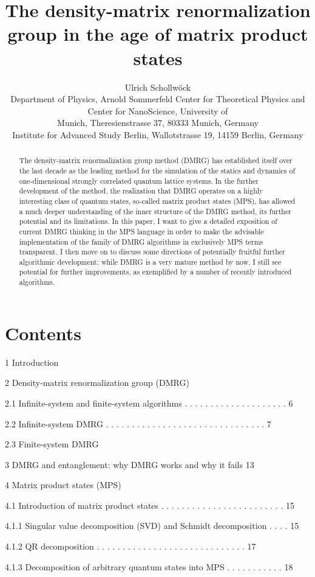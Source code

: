 \documentclass[12pt]{article}
\title{The density-matrix renormalization group in the age of matrix product states }
\author{Ulrich Schollwöck\\
Department of Physics, Arnold Sommerfeld Center for Theoretical Physics and Center for NanoScience, University of\\
Munich, Theresienstrasse 37, 80333 Munich, Germany\\
Institute for Advanced Study Berlin, Wallotstrasse 19, 14159 Berlin, Germany}
\date{}
\begin{document}
\maketitle


\begin{abstract}
The density-matrix renormalization group method (DMRG) has established itself over the last decade as the leading method for the simulation of the statics and dynamics of one-dimensional strongly correlated quantum lattice systems. In the further development of the method, the realization that DMRG operates on a highly interesting class of quantum states, so-called matrix product states (MPS), has allowed a much deeper understanding of the inner structure of the DMRG method, its further potential and its limitations. In this paper, I want to give a detailed exposition of current DMRG thinking in the MPS language in order to make the advisable implementation of the family of DMRG algorithms in exclusively MPS terms transparent. I then move on to discuss some directions of potentially fruitful further algorithmic development: while DMRG is a very mature method by now, I still see potential for further improvements, as exemplified by a number of recently introduced algorithms.
\end{abstract}

\section*{Contents}
1 Introduction

2 Density-matrix renormalization group (DMRG)

2.1 Infinite-system and finite-system algorithms . . . . . . . . . . . . . . . . . . . . 6

2.2 Infinite-system DMRG . . . . . . . . . . . . . . . . . . . . . . . . . . . . . . . 7

2.3 Finite-system DMRG

3 DMRG and entanglement: why DMRG works and why it fails 13

4 Matrix product states (MPS)

4.1 Introduction of matrix product states . . . . . . . . . . . . . . . . . . . . . . . . 15

4.1.1 Singular value decomposition (SVD) and Schmidt decomposition . . . . 15

4.1.2 QR decomposition . . . . . . . . . . . . . . . . . . . . . . . . . . . . . 17

4.1.3 Decomposition of arbitrary quantum states into MPS . . . . . . . . . . . 18
\end{document}

